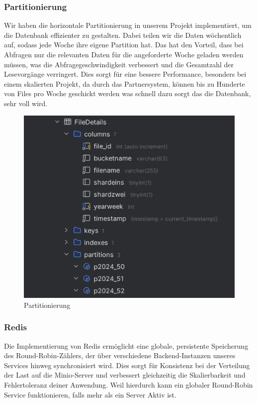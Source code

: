 \documentclass[12pt]{report}
\begin{document}
			\subsubsection{Partitionierung}
				Wir haben die horizontale Partitionierung in unserem Projekt implementiert, um die Datenbank effizienter zu gestalten. Dabei teilen wir die Daten wöchentlich auf, sodass jede Woche ihre eigene Partition hat. Das hat den Vorteil, dass bei Abfragen nur die relevanten Daten für die angeforderte Woche geladen werden müssen, was die Abfragegeschwindigkeit verbessert und die Gesamtzahl der Lesevorgänge verringert. Dies sorgt für eine bessere Performance, besonders bei einem skalierten Projekt, da durch das Partnersystem, können bis zu Hunderte von Files pro Woche geschickt werden was schnell dazu sorgt das die Datenbank, sehr voll wird.
				\begin{figure}[h]
					\centering
					\includegraphics[width=0.8\linewidth]{partitionierung}
					\caption{Partitionierung}
					\label{fig:partitionierung}
				\end{figure}
				
			\subsubsection{Redis}
				Die Implementierung von Redis ermöglicht eine globale, persistente Speicherung des Round-Robin-Zählers, der über verschiedene Backend-Instanzen unseres Services hinweg synchronisiert wird. Dies sorgt für Konsistenz bei der Verteilung der Last auf die Minio-Server und verbessert gleichzeitig die Skalierbarkeit und Fehlertoleranz deiner Anwendung. Weil hierdurch kann ein globaler Round-Robin Service funktionieren, falls mehr als ein Server Aktiv ist.
\end{document}
